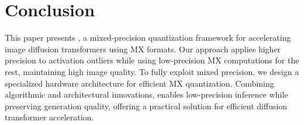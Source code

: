 \vspace{-0.3cm}
\section{Conclusion}
\vspace{-0.1cm}
%
This paper presents \sysname, a mixed-precision quantization framework for accelerating image diffusion transformers using MX formats. 
%
Our approach applies higher precision to activation outliers while using low-precision MX computations for the rest, maintaining high image quality. 
%
To fully exploit mixed precision, we design a specialized hardware architecture for efficient MX quantization.
%
Combining algorithmic and architectural innovations, \sysname enables low-precision inference while preserving generation quality, offering a practical solution for efficient diffusion transformer acceleration. 
%
